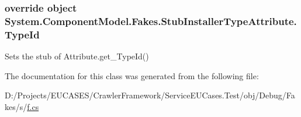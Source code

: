 \hypertarget{class_system_1_1_component_model_1_1_fakes_1_1_stub_installer_type_attribute_a31885cf1cf97a618fe53f626f508577f}{
\subsubsection[{Type\-Id}]{\setlength{\rightskip}{0pt plus 5cm}override object System.\-Component\-Model.\-Fakes.\-Stub\-Installer\-Type\-Attribute.\-Type\-Id\hspace{0.3cm}{\ttfamily [get]}}}\label{class_system_1_1_component_model_1_1_fakes_1_1_stub_installer_type_attribute_a31885cf1cf97a618fe53f626f508577f}


Sets the stub of Attribute.\-get\-\_\-\-Type\-Id()



The documentation for this class was generated from the following file\-:\begin{DoxyCompactItemize}
\item 
D\-:/\-Projects/\-E\-U\-C\-A\-S\-E\-S/\-Crawler\-Framework/\-Service\-E\-U\-Cases.\-Test/obj/\-Debug/\-Fakes/s/\hyperlink{s_2f_8cs}{f.\-cs}\end{DoxyCompactItemize}
